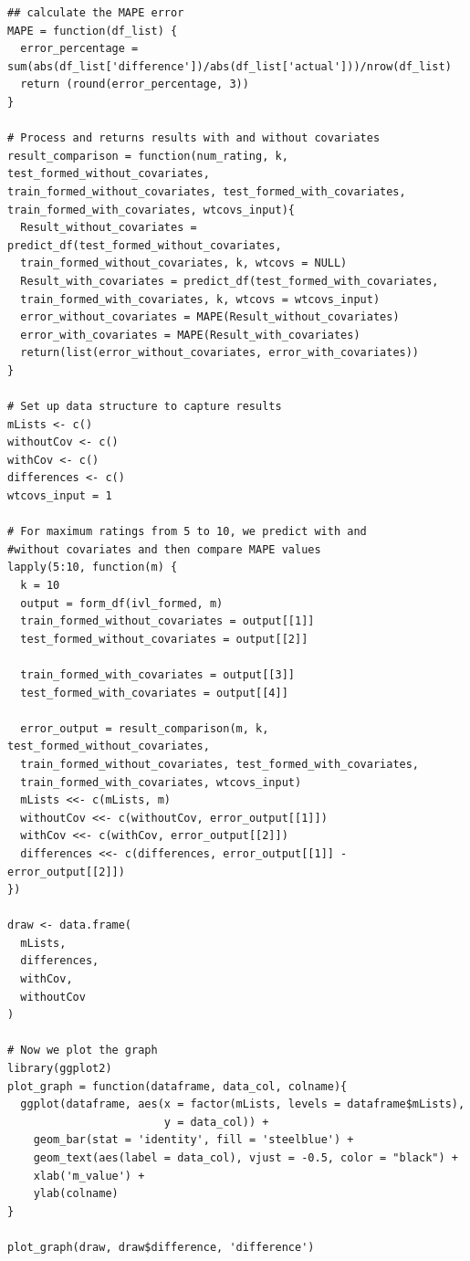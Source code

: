 \documentclass{article}
\begin{document}
\begin{verbatim}
## calculate the MAPE error
MAPE = function(df_list) {
  error_percentage = sum(abs(df_list['difference'])/abs(df_list['actual']))/nrow(df_list) 
  return (round(error_percentage, 3))
}

# Process and returns results with and without covariates
result_comparison = function(num_rating, k, test_formed_without_covariates, 
train_formed_without_covariates, test_formed_with_covariates, 
train_formed_with_covariates, wtcovs_input){
  Result_without_covariates = predict_df(test_formed_without_covariates, 
  train_formed_without_covariates, k, wtcovs = NULL)
  Result_with_covariates = predict_df(test_formed_with_covariates, 
  train_formed_with_covariates, k, wtcovs = wtcovs_input)
  error_without_covariates = MAPE(Result_without_covariates)
  error_with_covariates = MAPE(Result_with_covariates)
  return(list(error_without_covariates, error_with_covariates))
}

# Set up data structure to capture results
mLists <- c()
withoutCov <- c()
withCov <- c()
differences <- c()
wtcovs_input = 1

# For maximum ratings from 5 to 10, we predict with and 
#without covariates and then compare MAPE values
lapply(5:10, function(m) {
  k = 10
  output = form_df(ivl_formed, m)
  train_formed_without_covariates = output[[1]]
  test_formed_without_covariates = output[[2]]
  
  train_formed_with_covariates = output[[3]]
  test_formed_with_covariates = output[[4]]
  
  error_output = result_comparison(m, k, test_formed_without_covariates, 
  train_formed_without_covariates, test_formed_with_covariates, 
  train_formed_with_covariates, wtcovs_input)
  mLists <<- c(mLists, m)
  withoutCov <<- c(withoutCov, error_output[[1]])
  withCov <<- c(withCov, error_output[[2]])
  differences <<- c(differences, error_output[[1]] - error_output[[2]])
})

draw <- data.frame(
  mLists,
  differences,
  withCov,
  withoutCov
)

# Now we plot the graph
library(ggplot2)
plot_graph = function(dataframe, data_col, colname){
  ggplot(dataframe, aes(x = factor(mLists, levels = dataframe$mLists),
                        y = data_col)) +
    geom_bar(stat = 'identity', fill = 'steelblue') +
    geom_text(aes(label = data_col), vjust = -0.5, color = "black") +
    xlab('m_value') +
    ylab(colname)
}

plot_graph(draw, draw$difference, 'difference')
\end{verbatim}
\end{document}
